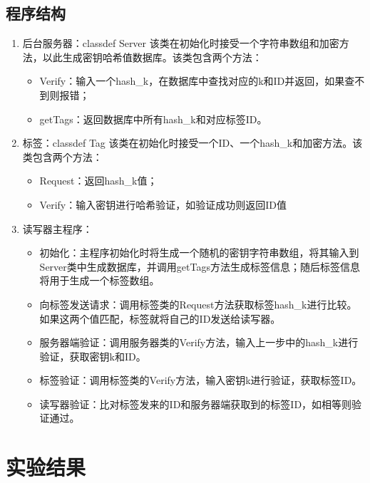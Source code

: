 \documentclass[a4paper]{ctexart}
\begin{document}
\subsection{程序结构}
\begin{enumerate}[label=\arabic*、]
	\item 后台服务器：classdef Server
	      该类在初始化时接受一个字符串数组和加密方法，以此生成密钥哈希值数据库。该类包含两个方法：
	      \begin{itemize}
		      \item Verify：输入一个hash\_k，在数据库中查找对应的k和ID并返回，如果查不到则报错；
		      \item getTags：返回数据库中所有hash\_k和对应标签ID。
	      \end{itemize}
	\item 标签：classdef Tag
	      该类在初始化时接受一个ID、一个hash\_k和加密方法。该类包含两个方法：
	      \begin{itemize}
		      \item Request：返回hash\_k值；
		      \item Verify：输入密钥进行哈希验证，如验证成功则返回ID值
	      \end{itemize}
	\item 读写器主程序：
	      \begin{itemize}
		      \item 初始化：主程序初始化时将生成一个随机的密钥字符串数组，将其输入到Server类中生成数据库，并调用getTags方法生成标签信息；随后标签信息将用于生成一个标签数组。
		      \item 向标签发送请求：调用标签类的Request方法获取标签hash\_k进行比较。如果这两个值匹配，标签就将自己的ID发送给读写器。
		      \item 服务器端验证：调用服务器类的Verify方法，输入上一步中的hash\_k进行验证，获取密钥k和ID。
		      \item 标签验证：调用标签类的Verify方法，输入密钥k进行验证，获取标签ID。
		      \item 读写器验证：比对标签发来的ID和服务器端获取到的标签ID，如相等则验证通过。
	      \end{itemize}
\end{enumerate}


\section{实验结果}
\end{document}
